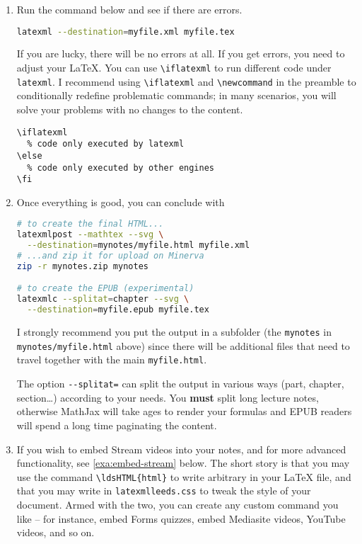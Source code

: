 \documentclass[a4paper]{article}
\def\ltxinline{\lstinline[style=latexml,frame=none]}
\theoremstyle{definition}
\begin{document}
\begin{enumerate}
\begin{lstlisting}[style=latexml]
% to improve the HTML style, \ldsHTML and other goodies
% load *after* loading all the other packages
\usepackage{latexmlleeds}
  \end{lstlisting}
  to your preamble. You should load \verb|latexmlleeds| \emph{after} loading all the other packages.
  \item Run the command below and see if there are errors.
  \begin{lstlisting}[language=bash]
latexml --destination=myfile.xml myfile.tex
  \end{lstlisting}
  If you are lucky, there will be no errors at all. If you get errors, you need to adjust your \LaTeX{}. You can use \ltxinline|\iflatexml| to run different code under \verb|latexml|. I recommend using \ltxinline|\iflatexml| and \ltxinline|\newcommand| in the preamble to conditionally redefine problematic commands; in many scenarios, you will solve your problems with no changes to the content.
  \begin{lstlisting}[style=latexml]
\iflatexml
  % code only executed by latexml
\else
  % code only executed by other engines
\fi
  \end{lstlisting}
  \item Once everything is good, you can conclude with
  \begin{lstlisting}[language=bash]
# to create the final HTML...
latexmlpost --mathtex --svg \
  --destination=mynotes/myfile.html myfile.xml
# ...and zip it for upload on Minerva
zip -r mynotes.zip mynotes

# to create the EPUB (experimental)
latexmlc --splitat=chapter --svg \
  --destination=myfile.epub myfile.tex
  \end{lstlisting}
  I strongly recommend you put the output in a subfolder (the \verb|mynotes| in \verb|mynotes/myfile.html| above) since there will be additional files that need to travel together with the main \verb|myfile.html|.

  The option \verb|--splitat=| can split the output in various ways (part, chapter, section\dots{}) according to your needs. You \textbf{must} split long lecture notes, otherwise MathJax will take ages to render your formulas and EPUB readers will spend a long time paginating the content.
  \item If you wish to embed Stream videos into your notes, and for more advanced functionality, see \autoref{exa:embed-stream} below. The short story is that you may use the command \ltxinline|\ldsHTML{html}| to write arbitrary \HTML{} in your \LaTeX{} file, and that you may write in \verb|latexmlleeds.css| to tweak the style of your document. Armed with the two, you can create any custom command you like -- for instance, embed Forms quizzes, embed Mediasite videos, YouTube videos, and so on.
\end{enumerate}
\end{document}
